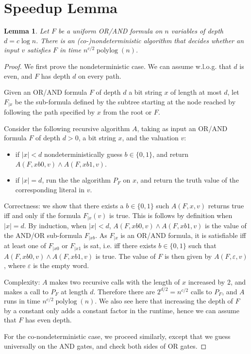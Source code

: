 \documentclass{article}
\newcommand{\bit}{\{0,1\}}%
\DeclareMathOperator*{\polylog}{polylog}
\theoremstyle{plain}
\newtheorem{lemma}[theorem]{Lemma}
\theoremstyle{definition}
\begin{document}
\section{Speedup Lemma}

\begin{lemma}\label{speedup-lemma}
	Let $F$ be a uniform OR/AND formula on $n$ variables of depth $d= c \log n$.
	There is an (co-)nondeterministic algorithm that decides
	whether an input $v$ satisfies $F$ in time $n^{c/2}\polylog(n)$.
\end{lemma}
\begin{proof}
	We first prove the nondeterministic case.
	We can assume w.l.o.g. that $d$ is even, and $F$ has depth $d$ on every path. 

	Given an OR/AND formula $F$ of depth $d$ a bit string $x$ of length at most $d$, let $F_{|x}$
	be the sub-formula defined by the subtree starting at the node reached by following the path specified by $x$ from the root or $F$.

	Consider the following recursive algorithm $A$, taking as input an OR/AND formula $F$ of depth $d > 0$, a bit string $x$, and the valuation $v$:
	\begin{itemize}
		\item 
	if $|x| < d$
	nondeterministically guess $b\in \bit$,
	and return $A(F, xb0, v) \wedge A(F, xb1, v)$.
		\item 
	if $|x| = d$, run the the algorithm $P_F$ on $x$, and return the truth value of the corresponding literal in $v$.
	\end{itemize}

	Correctness: we show that there exists a $b\in \bit$ such $A(F, x, v)$ returns true iff and only if
	the formula $F_{|x}(v)$ is true.
	This is follows by definition when $|x| = d$.
	By induction, when $|x| < d$, $A(F, xb0, v) \wedge A(F, xb1, v)$ is the value of the AND/OR sub-formula $F_{|xb}$. As $F_{|x}$ is an OR/AND formula, it is satisfiable iff at least one of $F_{|x0}$ or $F_{|x1}$ is sat, i.e. iff there exists $b\in \bit$ such that $A(F, xb0, v) \wedge A(F, xb1, v)$ is true.
	The value of $F$ is then given by $A(F, \varepsilon, v)$, where $\varepsilon$ is the empty word.

	Complexity: $A$ makes two recursive calls with the length of $x$ increased by $2$, 
	and makes a call to $P_F$ at length $d$.
	Therefore there are $2^{d/2} = n^{c/2}$ calls to $P_F$, and $A$ runs in time $n^{c/2}\polylog(n)$.
	We also see here that increasing the depth of $F$ by a constant only adds a constant factor in the runtime, hence we can assume that $F$ has even depth.

	For the co-nondeterministic case, we proceed similarly, except that we guess universally on the AND gates,
	and check both sides of OR gates.
\end{proof}
\end{document}
